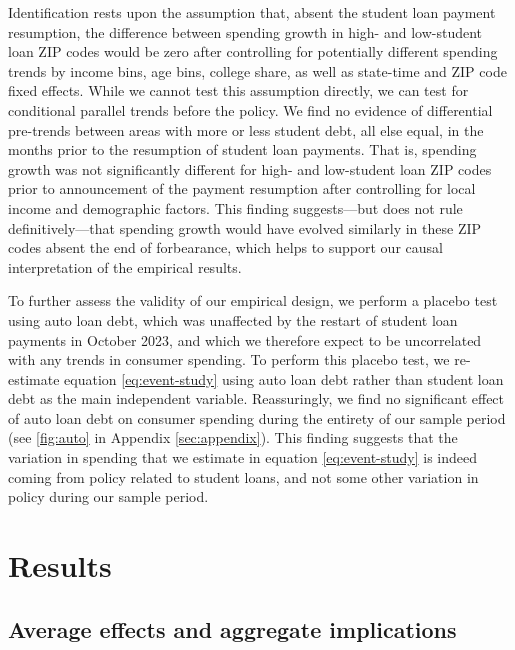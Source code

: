 \documentclass[12pt]{article}
\begin{document}
Identification rests upon the assumption that, absent the student loan payment resumption, the difference between spending growth in high- and low-student loan ZIP codes would be zero after controlling for potentially different spending trends by income bins, age bins, college share, as well as state-time and ZIP code fixed effects.  While we cannot test this assumption directly, we can test for conditional parallel trends before the policy. 
We find no evidence of differential pre-trends between areas with more or less student debt, all else equal, in the months prior to the resumption of student loan payments.
That is, spending growth was not significantly different for high- and low-student loan ZIP codes prior to announcement of the payment resumption after controlling for local income and demographic factors. This finding suggests---but does not rule definitively---that spending growth would have evolved similarly in these ZIP codes absent the end of forbearance, which helps to support our causal interpretation of the empirical results.

To further assess the validity of our empirical design, we perform a placebo test using auto loan debt, which was unaffected by the restart of student loan payments in October 2023, and which we therefore expect to be uncorrelated with any trends in consumer spending. To perform this placebo test, we re-estimate equation \eqref{eq:event-study} using auto loan debt rather than student loan debt as the main independent variable. Reassuringly, we find no significant effect of auto loan debt on consumer spending during the entirety of our sample period (see \cref{fig:auto} in Appendix \ref{sec:appendix}). This finding suggests that the variation in spending that we estimate in equation \eqref{eq:event-study} is indeed coming from policy related to student loans, and not some other variation in policy during our sample period.

\section{Results \label{sec:results}}

\subsection{Average effects and aggregate implications}
\end{document}
